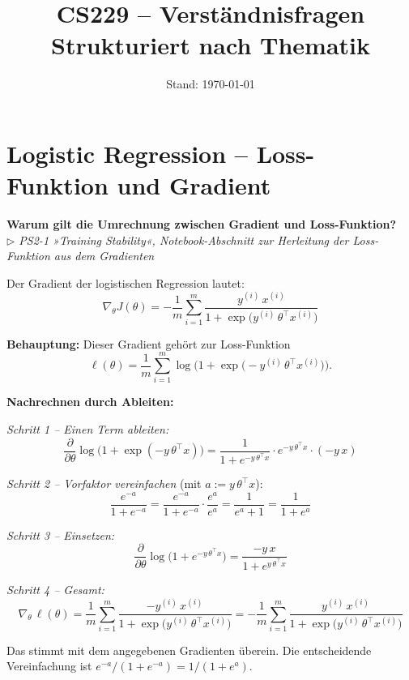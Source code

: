\documentclass[11pt, a4paper]{article}
\title{%
  \textbf{\color{sectioncol}CS229 -- Verständnisfragen}\\[4pt]
  \large Strukturiert nach Thematik
}
\author{}
\date{Stand: \today}
\newenvironment{frage}[2]{%
  \begin{tcolorbox}[frageboxstyle, title={Frage}]
  \textbf{#1}\\[3pt]
  {\small\itshape\color{black!55}\(\triangleright\) #2}
  \end{tcolorbox}
  \begin{tcolorbox}[antwortboxstyle]
}{%
  \end{tcolorbox}
  \vspace{4mm}
}
\begin{document}
\maketitle
\tableofcontents
\newpage

\section{Logistic Regression -- Loss-Funktion und Gradient}

\begin{frage}{Warum gilt die Umrechnung zwischen Gradient und Loss-Funktion?}{PS2-1 »Training Stability«, Notebook-Abschnitt zur Herleitung der Loss-Funktion aus dem Gradienten}

Der Gradient der logistischen Regression lautet:
\[
  \nabla_\theta J(\theta)
  = -\frac{1}{m} \sum_{i=1}^{m}
      \frac{y^{(i)}\, x^{(i)}}{1 + \exp\!\bigl(y^{(i)}\,\theta^\top x^{(i)}\bigr)}
\]

\textbf{Behauptung:} Dieser Gradient gehört zur Loss-Funktion
\[
  \ell(\theta)
  = \frac{1}{m} \sum_{i=1}^{m} \log\!\bigl(1 + \exp\!\bigl(-y^{(i)}\,\theta^\top x^{(i)}\bigr)\bigr).
\]

\textbf{Nachrechnen durch Ableiten:}

\textit{Schritt 1 -- Einen Term ableiten:}
\[
  \frac{\partial}{\partial\theta}
    \log\!\bigl(1 + \exp(-y\,\theta^\top x)\bigr)
  = \frac{1}{1 + e^{-y\,\theta^\top x}}
    \cdot e^{-y\,\theta^\top x} \cdot (-y\,x)
\]

\textit{Schritt 2 -- Vorfaktor vereinfachen} (mit $a := y\,\theta^\top x$):
\[
  \frac{e^{-a}}{1 + e^{-a}}
  = \frac{e^{-a}}{1 + e^{-a}} \cdot \frac{e^{a}}{e^{a}}
  = \frac{1}{e^{a} + 1}
  = \frac{1}{1 + e^{a}}
\]

\textit{Schritt 3 -- Einsetzen:}
\[
  \frac{\partial}{\partial\theta}
    \log\!\bigl(1 + e^{-y\,\theta^\top x}\bigr)
  = \frac{-y\,x}{1 + e^{y\,\theta^\top x}}
\]

\textit{Schritt 4 -- Gesamt:}
\[
  \nabla_\theta\,\ell(\theta)
  = \frac{1}{m} \sum_{i=1}^{m}
      \frac{-y^{(i)}\,x^{(i)}}{1 + \exp\!\bigl(y^{(i)}\,\theta^\top x^{(i)}\bigr)}
  = -\frac{1}{m} \sum_{i=1}^{m}
      \frac{y^{(i)}\,x^{(i)}}{1 + \exp\!\bigl(y^{(i)}\,\theta^\top x^{(i)}\bigr)}
\]

Das stimmt mit dem angegebenen Gradienten überein. Die entscheidende Vereinfachung ist
$e^{-a}/(1+e^{-a}) = 1/(1+e^{a})$.

\end{frage}
\end{document}

